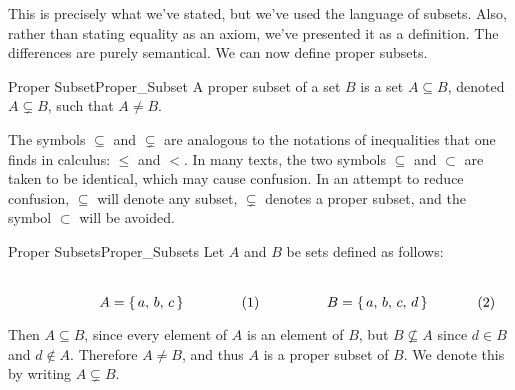         This is precisely what we've stated, but we've used the language of
        subsets. Also, rather than stating equality as an axiom, we've
        presented it as a definition. The differences are purely semantical.
        We can now define proper subsets.
        \begin{ldefinition}{Proper Subset}{Proper_Subset}
            A \gls{proper subset} of a set $B$ is a set $A\subseteq{B}$,
            denoted $A\subsetneq{B}$, such that $A\ne{B}$.
        \end{ldefinition}
        The symbols $\subseteq$ and $\subsetneq$ are analogous to the
        notations of inequalities that one finds in calculus: $\leq$ and $<$.
        In many texts, the two symbols $\subseteq$ and $\subset$ are taken to
        be identical, which may cause confusion. In an attempt to reduce
        confusion, $\subseteq$ will denote any subset, $\subsetneq$ denotes a
        proper subset, and the symbol $\subset$ will be avoided.
        \begin{lexample}{Proper Subsets}{Proper_Subsets}
            Let $A$ and $B$ be sets defined as follows:
            \par
            \begin{subequations}
                \begin{minipage}[b]{0.49\textwidth}
                    \centering
                    \begin{equation}
                        A=\{\,a,\,b,\,c\,\}
                    \end{equation}
                \end{minipage}
                \hfill
                \begin{minipage}[b]{0.49\textwidth}
                    \centering
                    \begin{equation}
                        B=\{\,a,\,b,\,c,\,d\,\}
                    \end{equation}
                \end{minipage}
            \end{subequations}
            \par\vspace{2.5ex}
            Then $A\subseteq{B}$, since every element of $A$ is an element of
            $B$, but $B\nsubseteq{A}$ since $d\in{B}$ and $d\notin{A}$.
            Therefore $A\ne{B}$, and thus $A$ is a  proper subset of $B$.
            We denote this by writing $A\subsetneq{B}$.
        \end{lexample}
